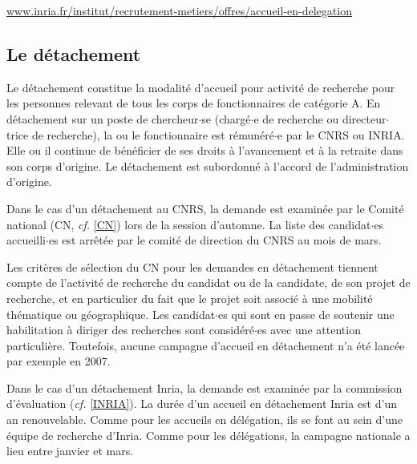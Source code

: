 \url{www.inria.fr/institut/recrutement-metiers/offres/accueil-en-delegation}

\subsection{Le d\'etachement}
\label{detachement}


Le d\'etachement constitue la modalit\'e d'accueil pour activit\'e
de recherche pour les personnes relevant de tous les corps de
fonctionnaires de cat\'egorie A. En d\'etachement sur un poste de
chercheur$\cdot$se (charg\'e$\cdot$e de recherche ou directeur$\cdot$trice de recherche), la ou le
fonctionnaire est r\'emun\'er\'e$\cdot$e par le CNRS ou INRIA. Elle ou il continue
de b\'en\'eficier de ses droits \`a l'avancement et \`a la retraite
dans son corps d'origine. Le d\'etachement est subordonn\'e \`a
l'accord de l'administration d'origine.

Dans le cas d'un d\'etachement au CNRS, la demande est examin\'ee
par le Comit\'e national (CN, {\em cf.} \ref{CN}) lors de la session
d'automne. La liste des candidat$\cdot$es accueilli$\cdot$es est arr\^et\'ee par le
comit\'e de direction du CNRS au mois de mars.

Les crit\`eres de s\'election du CN pour les demandes en
d\'etachement tiennent compte de l'activit\'e de recherche du
candidat ou de la candidate, de son projet de recherche, et en particulier du fait que
le projet soit associ\'e \`a une mobilit\'e th\'ematique ou
g\'eographique. Les candidat$\cdot$es qui sont en passe de soutenir une
habilitation \`a diriger des recherches sont consid\'er\'e$\cdot$es avec une
attention particuli\`ere. Toutefois, aucune campagne d'accueil en
d\'etachement n'a \'et\'e lanc\'ee par exemple en 2007.

Dans le cas d'un d\'etachement Inria, la demande est
examin\'ee par la commission d'\'evaluation ({\em cf.} \ref{INRIA}).
La dur\'ee d'un accueil en d\'etachement Inria est d'un an
renouvelable. Comme pour les accueils en d\'el\'egation, ils se font
au sein d'une \'equipe de recherche d'Inria. Comme pour les d\'el\'egations,
la campagne nationale a lieu entre janvier et mars.

